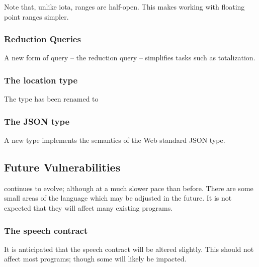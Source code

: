 Note that, unlike iota, ranges are half-open. This makes working with floating point ranges simpler.

\subsubsection{Reduction Queries}
A new form of query -- the reduction query -- simplifies tasks such as totalization.

\subsubsection{The location type}
The  type has been renamed to 

\subsubsection{The JSON type}
A new type  implements the semantics of the Web standard JSON type.

\subsection{Future Vulnerabilities}
\Sr continues to evolve; although at a much slower pace than before. There are some small areas of the language which may be adjusted in the future. It is not expected that they will affect many existing programs.

\subsubsection{The speech contract}
It is anticipated that the speech contract will be altered slightly. This should not affect most programs; though some will likely be impacted.

